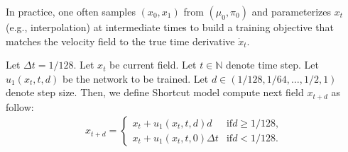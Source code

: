 In practice, one often samples $(x_0, x_1)$ from $(\mu_0, \pi_0)$ and parameterizes $x_t$ (e.g., interpolation) at intermediate times to build a training objective that matches the velocity field to the true time derivative $\dot{x}_t$.

\begin{definition}
\label{def:shortcut_models}

Let $\Delta t = 1 / 128$. 
Let $x_t$ be current field. 
Let $t \in \mathbb{N}$ denote time step. 
Let $u_1( x_t, t, d )$ be the network to be trained. 
Let $d \in ( 1 / 128, 1 / 64,\dots, 1 / 2, 1 )$ denote step size. 
Then, we define Shortcut model compute next field $x_{t + d}$ as follow: 
\begin{align*}
x_{t + d} = 
\begin{cases}
x_t + u_1( x_t, t, d ) d & \mathrm{if } d \geq 1 / 128, \\
x_t + u_1( x_t, t, 0 ) \Delta t & \mathrm{if } d < 1 / 128.
\end{cases}
\end{align*}
\end{definition}

